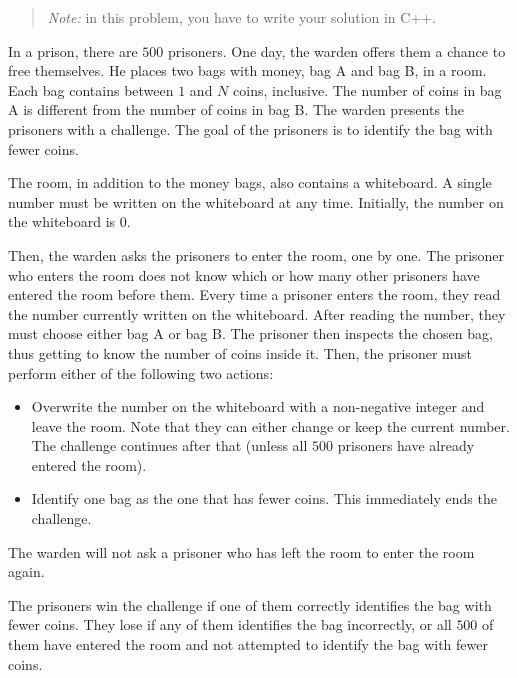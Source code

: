 
\begin{quote}
\textit{Note:} in this problem, you have to write your solution in C++.
\end{quote}

In a prison, there are $500$ prisoners. One day, the warden offers them a chance to free themselves.
He places two bags with money, bag A and bag B, in a room. Each bag contains between $1$ and $N$
coins, inclusive. The number of coins in bag A is different from the number of coins in bag B. The
warden presents the prisoners with a challenge. The goal of the prisoners is to identify the bag with
fewer coins.

The room, in addition to the money bags, also contains a whiteboard. A single number must be written
on the whiteboard at any time. Initially, the number on the whiteboard is $0$.

Then, the warden asks the prisoners to enter the room, one by one. The prisoner who enters the room
does not know which or how many other prisoners have entered the room before them. Every time a
prisoner enters the room, they read the number currently written on the whiteboard. After reading the
number, they must choose either bag A or bag B. The prisoner then inspects the chosen bag, thus getting
to know the number of coins inside it. Then, the prisoner must perform either of the following two
actions:
\begin{itemize}
  \item Overwrite the number on the whiteboard with a non-negative integer and leave the room. Note
  that they can either change or keep the current number. The challenge continues after that (unless
  all $500$ prisoners have already entered the room).
  \item Identify one bag as the one that has fewer coins. This immediately ends the challenge.
\end{itemize}

The warden will not ask a prisoner who has left the room to enter the room again.

The prisoners win the challenge if one of them correctly identifies the bag with fewer coins. They lose
if any of them identifies the bag incorrectly, or all $500$ of them have entered the room and not
attempted to identify the bag with fewer coins.

